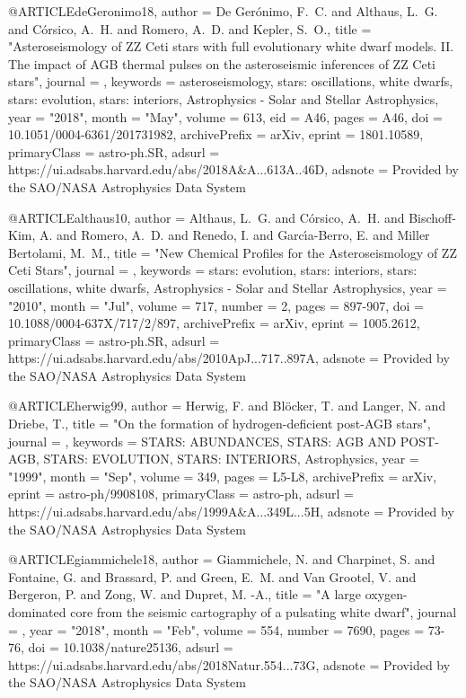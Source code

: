 \documentclass[a4paper,fleqn,usenatbib]{mnras}
\begin{document}
{{{{{{{{{{{@ARTICLE{deGeronimo18,
       author = {{De Ger{\'o}nimo}, F.~C. and {Althaus}, L.~G. and {C{\'o}rsico}, A.~H. and
         {Romero}, A.~D. and {Kepler}, S.~O.},
        title = "{Asteroseismology of ZZ Ceti stars with full evolutionary white dwarf models. II. The impact of AGB thermal pulses on the asteroseismic inferences of ZZ Ceti stars}",
      journal = {\aap},
     keywords = {asteroseismology, stars: oscillations, white dwarfs, stars: evolution, stars: interiors, Astrophysics - Solar and Stellar Astrophysics},
         year = "2018",
        month = "May",
       volume = {613},
          eid = {A46},
        pages = {A46},
          doi = {10.1051/0004-6361/201731982},
archivePrefix = {arXiv},
       eprint = {1801.10589},
 primaryClass = {astro-ph.SR},
       adsurl = {https://ui.adsabs.harvard.edu/abs/2018A&A...613A..46D},
      adsnote = {Provided by the SAO/NASA Astrophysics Data System}
}

@ARTICLE{althaus10,
       author = {{Althaus}, L.~G. and {C{\'o}rsico}, A.~H. and {Bischoff-Kim}, A. and
         {Romero}, A.~D. and {Renedo}, I. and {Garc{\'\i}a-Berro}, E. and
         {Miller Bertolami}, M.~M.},
        title = "{New Chemical Profiles for the Asteroseismology of ZZ Ceti Stars}",
      journal = {\apj},
     keywords = {stars: evolution, stars: interiors, stars: oscillations, white dwarfs, Astrophysics - Solar and Stellar Astrophysics},
         year = "2010",
        month = "Jul",
       volume = {717},
       number = {2},
        pages = {897-907},
          doi = {10.1088/0004-637X/717/2/897},
archivePrefix = {arXiv},
       eprint = {1005.2612},
 primaryClass = {astro-ph.SR},
       adsurl = {https://ui.adsabs.harvard.edu/abs/2010ApJ...717..897A},
      adsnote = {Provided by the SAO/NASA Astrophysics Data System}
}

@ARTICLE{herwig99,
       author = {{Herwig}, F. and {Bl{\"o}cker}, T. and {Langer}, N. and {Driebe}, T.},
        title = "{On the formation of hydrogen-deficient post-AGB stars}",
      journal = {\aap},
     keywords = {STARS: ABUNDANCES, STARS: AGB AND POST-AGB, STARS: EVOLUTION, STARS: INTERIORS, Astrophysics},
         year = "1999",
        month = "Sep",
       volume = {349},
        pages = {L5-L8},
archivePrefix = {arXiv},
       eprint = {astro-ph/9908108},
 primaryClass = {astro-ph},
       adsurl = {https://ui.adsabs.harvard.edu/abs/1999A&A...349L...5H},
      adsnote = {Provided by the SAO/NASA Astrophysics Data System}
}

@ARTICLE{giammichele18,
       author = {{Giammichele}, N. and {Charpinet}, S. and {Fontaine}, G. and
         {Brassard}, P. and {Green}, E.~M. and {Van Grootel}, V. and
         {Bergeron}, P. and {Zong}, W. and {Dupret}, M. -A.},
        title = "{A large oxygen-dominated core from the seismic cartography of a pulsating white dwarf}",
      journal = {\nat},
         year = "2018",
        month = "Feb",
       volume = {554},
       number = {7690},
        pages = {73-76},
          doi = {10.1038/nature25136},
       adsurl = {https://ui.adsabs.harvard.edu/abs/2018Natur.554...73G},
      adsnote = {Provided by the SAO/NASA Astrophysics Data System}
}

}}}}}}}}}}}
\end{document}
